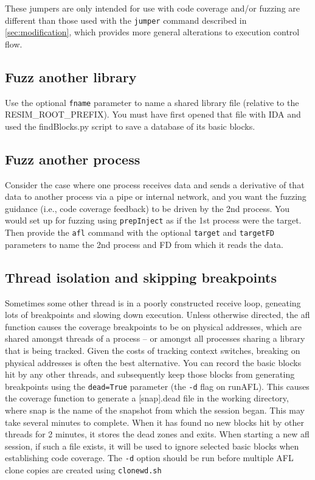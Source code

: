\documentclass[titlepage]{article}
\begin{document}
These jumpers are only intended for use with code coverage and/or fuzzing are different than those used with the {\tt jumper} command described
in \ref{sec:modification},
which provides more general alterations to execution control flow.

\subsection{Fuzz another library}
Use the optional {\tt fname} parameter to name a shared library file (relative to the RESIM\_ROOT\_PREFIX).  You must have first
opened that file with IDA and used the findBlocks.py script to save a database of its basic blocks.

\subsection{Fuzz another process}
Consider the case where one process receives data and sends a derivative of that data to another process via a pipe or internal network,
and you want the fuzzing guidance (i.e., code coverage feedback) to be driven by the 2nd process.  You would set up for fuzzing using
{\tt prepInject} as if the 1st process were the target.  Then provide the {\tt afl} command with the optional {\tt target} and {\tt targetFD}
parameters to name the 2nd process and FD from which it reads the data.

\subsection{Thread isolation and skipping breakpoints}
Sometimes some other thread is in a poorly constructed receive loop, geneating lots of breakpoints and slowing down execution.
Unless otherwise directed, the afl function causes the coverage breakpoints to be on physical addresses, which are shared amongst threads of a process -- or amongst
all processes sharing a library that is being tracked.  Given the costs
of tracking context switches, breaking on physical addresses is often the best alternative.  
You can record the basic blocks hit by any other threads, and subsequently keep those blocks from generating
breakpoints using the {\tt dead=True} parameter (the {\tt -d} flag on runAFL).  This causes the coverage function to generate a [snap].dead file in the working directory, where snap is the
name of the snapshot from which the session began.  This may take several minutes to complete.  When it has found no new blocks hit by other threads for 2 minutes, it stores the
dead zones and exits. When starting a new afl session, if such a file exists, it will be used to ignore selected basic blocks
when establishing code coverage.  The {\tt -d} option should be run before multiple AFL clone copies are created using {\tt clonewd.sh}
\end{document}
